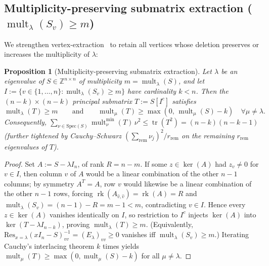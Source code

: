 \documentclass[11pt,reqno]{amsart}
\newtheorem{proposition}[theorem]{Proposition}
\theoremstyle{definition}
\theoremstyle{remark}
\numberwithin{equation}{section}
\numberwithin{table}{section}
\DeclareMathOperator{\tr}{tr}
\DeclareMathOperator{\rk}{rk}
\DeclareMathOperator{\mult}{mult}
\begin{document}
\subsection{Multiplicity-preserving submatrix extraction (\texorpdfstring{$\mult_\lambda(S_v) \ge m$}{mult >= m})}
We strengthen vertex-extraction~\cite[Lem.~2.10]{GS2024} to retain all vertices whose deletion preserves or increases the multiplicity of $\lambda$:

\begin{proposition}[Multiplicity-preserving submatrix extraction]\label{prop:prop61}
Let $\lambda$ be an eigenvalue of $S \in \mathbb{Z}^{n \times n}$ of multiplicity $m = \mult_\lambda(S)$, and let $I := \{v \in \{1, \dots, n\} : \mult_\lambda(S_v) \ge m\}$ have cardinality $k < n$. Then the $(n - k) \times (n - k)$ principal submatrix $T := S[I^c]$ satisfies
\[
  \mult_\lambda(T) \ge m \qquad \text{and} \qquad \mult_\mu(T) \ge \max(0,\, \mult_\mu(S) - k) \quad \forall \mu \neq \lambda.
\]
Consequently, $\sum_{\nu \in \mathrm{Spec}(S)} \mult_\nu^{\min}(T)\,\nu^2 \le \tr(T^2) = (n - k)(n - k - 1)$ (further tightened by Cauchy--Schwarz $(\sum_{\mathrm{rem}}\nu_j)^2 / r_{\mathrm{rem}}$ on the remaining $r_{\mathrm{rem}}$ eigenvalues of $T$).
\end{proposition}

\begin{proof}
Set $A := S - \lambda I_n$, of rank $R = n - m$. If some $z \in \ker(A)$ had $z_v \neq 0$ for $v \in I$, then column $v$ of $A$ would be a linear combination of the other $n - 1$ columns; by symmetry $A^T = A$, row $v$ would likewise be a linear combination of the other $n - 1$ rows, forcing $\rk(A_{\hat{v},\hat{v}}) = \rk(A) = R$ and $\mult_\lambda(S_v) = (n - 1) - R = m - 1 < m$, contradicting $v \in I$. Hence every $z \in \ker(A)$ vanishes identically on $I$, so restriction to $I^c$ injects $\ker(A)$ into $\ker(T - \lambda I_{n-k})$, proving $\mult_\lambda(T) \ge m$. (Equivalently, $\mathrm{Res}_{x=\lambda}(xI_n - S)^{-1}_{vv} = (E_\lambda)_{vv} \ge 0$ vanishes iff $\mult_\lambda(S_v) \ge m$.) Iterating Cauchy's interlacing theorem $k$ times yields $\mult_\mu(T) \ge \max(0, \mult_\mu(S) - k)$ for all $\mu \neq \lambda$.
\end{proof}
\end{document}
